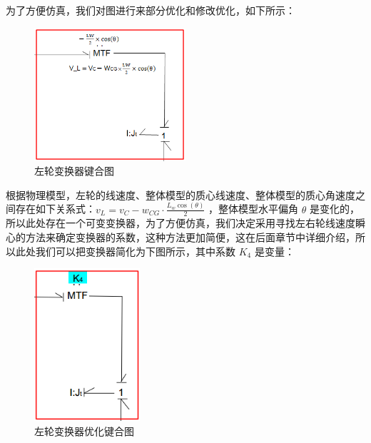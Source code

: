 为了方便仿真，我们对图进行来部分优化和修改优化，如下所示：
\begin{figure}[H]
	\centering
	\includegraphics[width=0.5\textwidth]{fig/bond/MDM4.png}
	\caption{左轮变换器键合图}\label{fig:bond_MDM4}
\end{figure}

根据物理模型，左轮的线速度、整体模型的质心线速度、整体模型的质心角速度之间存在如下关系式：$v_L=v_C-w_{CG} \cdot \frac{L_w \cos(\theta)}{2}$ ，整体模型水平偏角 $ \theta $ 是变化的，所以此处存在一个可变变换器，为了方便仿真，我们决定采用寻找左右轮线速度瞬心的方法来确定变换器的系数，这种方法更加简便，这在后面章节中详细介绍，所以此处我们可以把变换器简化为下图所示，其中系数 $K_4$ 是变量：
\begin{figure}[H]
	\centering
	\includegraphics[width=0.35\textwidth]{fig/bond/MDM5.png}
	\caption{左轮变换器优化键合图}\label{fig:bond_MDM5}
\end{figure}


